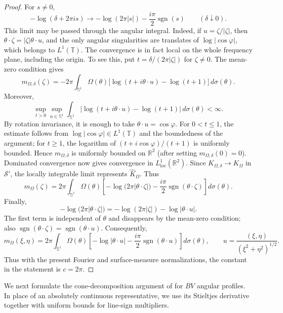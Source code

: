\documentclass[11pt]{amsart}
\theoremstyle{remark}
\numberwithin{equation}{section}
\newcommand{\R}{\mathbb R}
\newcommand{\T}{\mathbb T}
\newcommand{\Sph}{\mathbb S^1}
\newcommand{\sgn}{\operatorname{sgn}}
\begin{document}
\begin{proof}
		For \(s\ne0\),
		\[
		-\log(\delta+2\pi i s)
		\longrightarrow
		-\log(2\pi|s|)-\frac{i\pi}{2}\sgn(s)
		\qquad(\delta\downarrow0).
		\]
		This limit may be passed through the angular integral. Indeed, if
		\(u=\zeta/|\zeta|\), then
		\(\theta\cdot\zeta=|\zeta|\theta\cdot u\), and the only angular
		singularities are translates of \(\log|\cos\varphi|\), which belongs to
		\(L^1(\T)\). The convergence is in fact local on the whole frequency
		plane, including the origin. To see this, put
		\(t=\delta/(2\pi|\zeta|)\) for \(\zeta\ne0\). The mean-zero condition gives
		\[
		m_{\Omega,\delta}(\zeta)
		=
		-2\pi\int_{\Sph}\Omega(\theta)
		\bigl[\log(t+i\theta\cdot u)-\log(t+1)\bigr]\,d\sigma(\theta).
		\]
		Moreover,
		\[
		\sup_{t>0}\sup_{u\in\Sph}
		\int_{\Sph}
		\bigl|\log(t+i\theta\cdot u)-\log(t+1)\bigr|\,d\sigma(\theta)<\infty.
		\]
		By rotation invariance, it is enough to take \(\theta\cdot u=\cos\varphi\).
		For \(0<t\le1\), the estimate follows from
		\(\log|\cos\varphi|\in L^1(\T)\) and the boundedness of the argument; for
		\(t\ge1\), the logarithm of \((t+i\cos\varphi)/(t+1)\) is uniformly
		bounded. Hence \(m_{\Omega,\delta}\) is uniformly bounded on \(\R^2\)
		(after setting \(m_{\Omega,\delta}(0)=0\)). Dominated convergence now gives
		convergence in \(L^1_{\mathrm{loc}}(\R^2)\). Since
		\(K_{\Omega,\delta}\to K_\Omega\) in \(\mathcal S'\), the locally
		integrable limit represents \(\widehat K_\Omega\). Thus
		\[
		m_\Omega(\zeta)
		=
		2\pi\int_{\Sph}\Omega(\theta)
		\left[
		-\log\bigl(2\pi|\theta\cdot\zeta|\bigr)
		-\frac{i\pi}{2}\sgn(\theta\cdot\zeta)
		\right]d\sigma(\theta).
		\]
		Finally,
		\[
		-\log\bigl(2\pi|\theta\cdot\zeta|\bigr)
		=
		-\log(2\pi|\zeta|)-\log|\theta\cdot u|.
		\]
		The first term is independent of \(\theta\) and disappears by the
		mean-zero condition; also
		\(\sgn(\theta\cdot\zeta)=\sgn(\theta\cdot u)\). Consequently,
		\[
		m_\Omega(\xi,\eta)
		=
		2\pi\int_{\Sph}\Omega(\theta)
		\left[
		-\log|\theta\cdot u|
		-\frac{i\pi}{2}\sgn(\theta\cdot u)
		\right]d\sigma(\theta),
		\qquad
		u=\frac{(\xi,\eta)}{(\xi^2+\eta^2)^{1/2}}.
		\]
		Thus with the present Fourier and surface-measure normalizations, the
		constant in the statement is \(c=2\pi\).
	\end{proof}
	
	We next formulate the cone-decomposition argument of \cite{DGHST2011} for
	\(BV\) angular profiles.  In place of an absolutely continuous representative,
	we use its Stieltjes derivative together with uniform bounds for line-sign
	multipliers.
	
\end{document}
